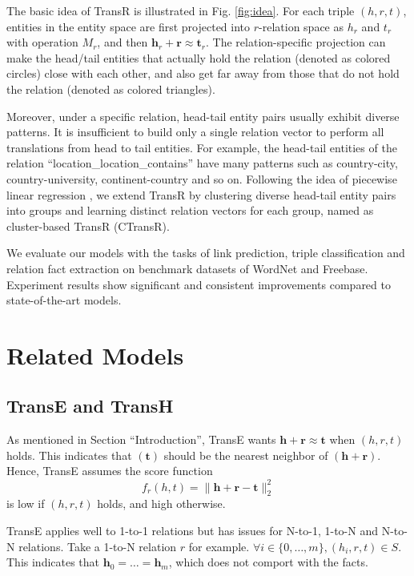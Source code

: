   The basic idea of TransR is illustrated in Fig. \ref{fig:idea}. For each triple $(h, r, t)$, entities in the entity space are first projected into $r$-relation space as $h_r$ and $t_r$ with operation $M_r$, and then $\mathbf{h}_r + \mathbf{r} \approx \mathbf{t}_r$. The relation-specific projection can make the head/tail entities that actually hold the relation (denoted as colored circles) close with each other, and also get far away from those that do not hold the relation (denoted as colored triangles).

  Moreover, under a specific relation, head-tail entity pairs usually exhibit diverse patterns. It is insufficient to build only a single relation vector to perform all translations from head to tail entities. For example, the head-tail entities of the relation ``location\_location\_contains'' have many patterns such as country-city, country-university, continent-country and so on. Following the idea of piecewise linear regression , we extend TransR by clustering diverse head-tail entity pairs into groups and learning distinct relation vectors for each group, named as cluster-based TransR (CTransR).

  We evaluate our models with the tasks of link prediction, triple classification and relation fact extraction on benchmark datasets of WordNet and Freebase. Experiment results show significant and consistent improvements compared to state-of-the-art models.


  \section{Related Models}

    \subsection{TransE and TransH}
    As mentioned in Section ``Introduction'', TransE  wants $\mathbf{h} + \mathbf{r} \approx \mathbf{t}$ when $(h, r, t)$ holds. This indicates that $(\mathbf{t})$ should be the nearest neighbor of $(\mathbf{h} + \mathbf{r})$. Hence, TransE assumes the score function
    \begin{equation}
    f_{r}(h, t) = \|\mathbf{h} + \mathbf{r} - \mathbf{t}\|_{2}^{2}
    \end{equation}
    is low if $(h, r, t)$ holds, and high otherwise.

    TransE applies well to 1-to-1 relations but has issues for N-to-1, 1-to-N and N-to-N relations. Take a 1-to-N relation $r$ for example. $\forall i \in \{0, \ldots, m\}, (h_i, r, t) \in S$. This indicates that $\mathbf{h}_0 = \ldots = \mathbf{h}_m$, which does not comport with the facts.

